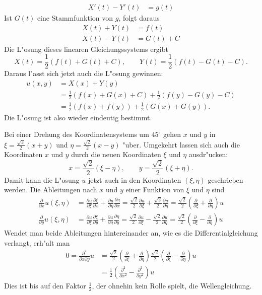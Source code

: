 \begin{loesung}
\begin{teilaufgaben}
\begin{align*}
X'(t)-Y'(t)&=g(t)
\end{align*}
Ist $G(t)$ eine Stammfunktion von $g$, folgt daraus
\begin{align*}
X(t)+Y(t)&=f(t)\\
X(t)-Y(t)&=G(t) + C
\end{align*}
Die L"osung dieses linearen Gleichungssystems ergibt
\[
X(t)=\frac12(f(t)+G(t)+C),\qquad 
Y(t)=\frac12(f(t)-G(t)-C).
\]
Daraus l"asst sich jetzt auch die L"osung gewinnen:
\begin{align*}
u(x,y)&=X(x)+Y(y)
\\
&=
\frac12(f(x)+G(x)+C)
+
\frac12(f(y)-G(y)-C)
\\
&=
\frac12(f(x)+f(y))+\frac12(G(x)+G(y)).
\end{align*}
Die L"osung ist also wieder eindeutig bestimmt.
\item
Bei einer Drehung des Koordinatensystems um $45^\circ$ gehen
$x$ und $y$ in $\xi=\frac{\sqrt{2}}2(x+y)$ und $\eta=\frac{\sqrt{2}}2(x-y)$
"uber. Umgekehrt lassen sich auch die Koordinaten $x$ und $y$ durch
die neuen Koordinaten $\xi$ und $\eta$ ausdr"ucken:
\[
x=\frac{\sqrt{2}}2(\xi-\eta),\qquad y=\frac{\sqrt{2}}2(\xi+\eta).
\]
Damit kann die L"osung $u$ jetzt auch in den Koordinaten $(\xi,\eta)$
geschrieben werden. Die Ableitungen nach $x$ und $y$
einer Funktion von $\xi$
und $\eta$ sind
\begin{align*}
\frac{\partial}{\partial x}u(\xi,\eta)
&=
\frac{\partial u}{\partial \xi}\frac{\partial \xi}{\partial x}
+
\frac{\partial u}{\partial \eta}\frac{\partial \eta}{\partial x}
=
\frac{\sqrt{2}}2\frac{\partial u}{\partial\xi}
+\frac{\sqrt{2}}2\frac{\partial u}{\partial\eta}
=
\frac{\sqrt{2}}2\left(\frac{\partial}{\partial \xi}+\frac{\partial}{\partial\eta}\right)u
\\
\frac{\partial}{\partial y}u(\xi,\eta)
&=
\frac{\partial u}{\partial \xi}\frac{\partial \xi}{\partial y}
+
\frac{\partial u}{\partial \eta}\frac{\partial \eta}{\partial y}
=
\frac{\sqrt{2}}2\frac{\partial u}{\partial\xi}
-\frac{\sqrt{2}}2\frac{\partial u}{\partial\eta}
=
\frac{\sqrt{2}}2\left(\frac{\partial}{\partial \xi}-\frac{\partial}{\partial\eta}\right)u
\end{align*}
Wendet man beide Ableitungen hintereinander an, wie es die
Differentialgleichung verlangt, erh"alt man
\begin{align*}
0=\frac{\partial^2}{\partial x\partial y}u
&=
\frac{\sqrt{2}}2
\left(\frac{\partial}{\partial \xi}+\frac{\partial}{\partial\eta}\right)
\frac{\sqrt{2}}2
\left(\frac{\partial}{\partial \xi}-\frac{\partial}{\partial\eta}\right)u
\\
&=
\frac12
\left(
\frac{\partial^2}{\partial x^2}-\frac{\partial^2}{\partial y^2}
\right)u
\end{align*}
Dies ist bis auf den Faktor $\frac12$, der ohnehin kein Rolle spielt,
die Wellengleichung.
\qedhere
\end{teilaufgaben}
\end{loesung}
